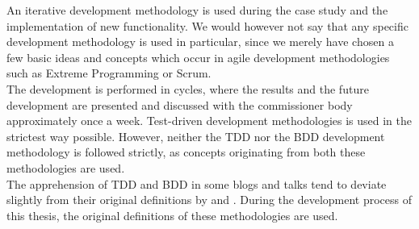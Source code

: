 
An iterative development methodology is used during the case study and
the implementation of new functionality. We would however not say that
any specific development methodology is used in particular, since we
merely have chosen a few basic ideas and concepts which occur in agile
development methodologies such as Extreme Programming or Scrum.\\

The development is performed in cycles, where the results and the future
development are presented and discussed with the commissioner body
approximately once a week. Test-driven development methodologies is used
in the strictest way possible. However, neither the TDD nor the BDD
development methodology is followed strictly, as concepts originating
from both these methodologies are used.\\

The apprehension of TDD and BDD in some blogs and talks tend to deviate
slightly from their original definitions by \citeauthor{book:tdd_beck}
and \citeauthor{web:dan_north}. During the development process of this
thesis, the original definitions of these methodologies are used.\\
